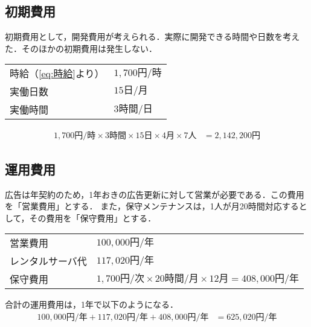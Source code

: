 \subsection{初期費用}
初期費用として，開発費用が考えられる．実際に開発できる時間や日数を考えた．そのほかの初期費用は発生しない．
\begin{framed}
    \begin{tabular}{ll}
        時給（\eqref{eq:時給}より） & \(1,700\text{円/時}\) \\
        実働日数                & \(15\text{日/月}\)    \\
        実働時間                & \(3\text{時間/日}\)
    \end{tabular}
\end{framed}
\begin{equation}
    \begin{aligned}
        1,700{円/時}\times 3\text{時間}\times 15\text{日}\times 4\text{月}\times 7\text{人} & = 2,142,200\text{円}\label{eq:開発費用}
    \end{aligned}
\end{equation}
\subsection{運用費用}
広告は年契約のため，1年おきの広告更新に対して営業が必要である．この費用を「営業費用」とする．
また，保守メンテナンスは，1人が月20時間対応するとして，その費用を「保守費用」とする．
\begin{framed}
    \begin{tabular}{ll}
        営業費用     & \(100,000\text{円/年}\)                                                      \\
        レンタルサーバ代 & \(117,020\text{円/年}\)                                                      \\
        保守費用     & \(1,700\text{円/次}\times 20\text{時間/月}\times 12\text{月}=408,000\text{円/年}\) \\
    \end{tabular}
\end{framed}
合計の運用費用は，1年で以下のようになる．
\begin{equation}
    \begin{aligned}
        100,000\text{円/年}+117,020\text{円/年}+408,000\text{円/年} & =625,020\text{円/年}\label{eq:運用費用}
    \end{aligned}
\end{equation}
